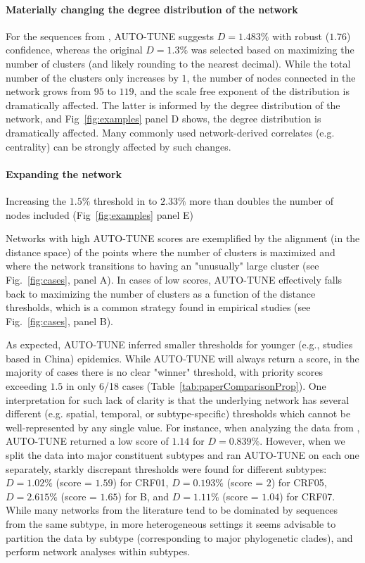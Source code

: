 \documentclass[utf8]{FrontiersinHarvard} %
\begin{document}
\paragraph{Materially changing the degree distribution of the network}  For the sequences from \citet{Li:2022aa}, AUTO-TUNE suggests $D = 1.483\%$ with
robust ($1.76$) confidence, whereas the original $D = 1.3\%$ was selected based
on maximizing the number of clusters (and likely rounding to the nearest
decimal). While the total number of the clusters only increases by $1$, the
number of nodes connected in the network grows from $95$ to $119$, and the
scale free exponent of the distribution is dramatically affected. The latter is
informed by the degree distribution of the network, and
Fig~\ref{fig:examples} panel D shows, the degree distribution is
dramatically affected. Many commonly used network-derived correlates (e.g.
centrality) can be strongly affected by such changes.

\paragraph{Expanding the network}  Increasing the $1.5\%$ threshold in \citet{Billings:2019aa} to $2.33\%$ more
than doubles the number of nodes included (Fig~\ref{fig:examples} panel E)

Networks with high AUTO-TUNE scores are exemplified by the alignment (in the
distance space) of the points where the number of clusters is maximized and
where the network transitions to having an "unusually" large cluster (see
Fig.~\ref{fig:cases}, panel A). In cases of low scores, AUTO-TUNE
effectively falls back to maximizing the number of clusters as a function of
the distance thresholds, which is a common strategy found in empirical studies
(see Fig.~\ref{fig:cases}, panel B).

As expected, AUTO-TUNE inferred smaller thresholds for younger (e.g., studies
based in China) epidemics. While AUTO-TUNE will always return a score, in the
majority of cases there is no clear "winner" threshold, with priority scores
exceeding $1.5$ in only 6/18 cases (Table~\ref{tab:paperComparisonProp}). One
interpretation for such lack of clarity is that the underlying network has
several different (e.g. spatial, temporal, or subtype-specific) thresholds
which cannot be well-represented by any single value. For instance, when
analyzing the data from \citet{Yan:2021aa}, AUTO-TUNE returned a low score of
$1.14$ for $D=0.839\%$. However, when we split the data into major constituent
subtypes and ran AUTO-TUNE on each one separately, starkly discrepant
thresholds were found for different subtypes: $D=1.02\%$ (score = $1.59$) for
CRF01, $D=0.193\%$ (score = $2$) for CRF05, $D=2.615\%$ (score = $1.65$) for B,
and $D=1.11\%$ (score = $1.04$) for CRF07. While many networks from the
literature tend to be dominated by sequences from the same subtype, in more
heterogeneous settings it seems advisable to partition the data by subtype
(corresponding to major phylogenetic clades), and perform network analyses
within subtypes.
\end{document}
